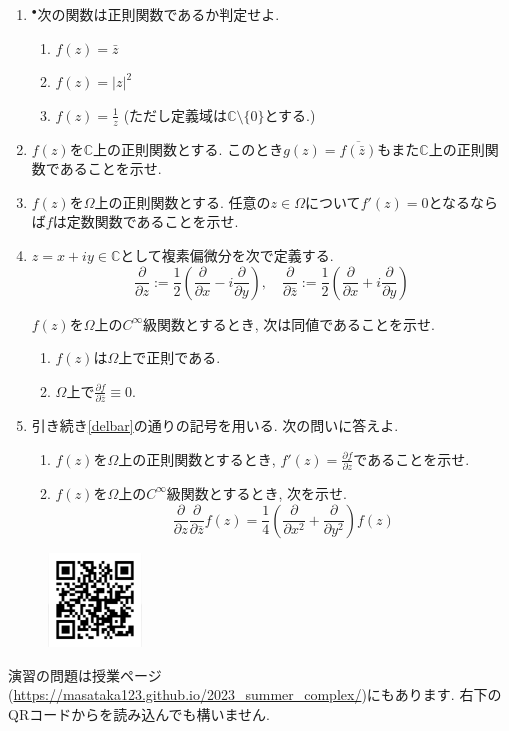 \documentclass[dvipdfmx,a4paper,11pt]{article}
\newcommand{\C}{\mathbb{C}}
\theoremstyle{definition}
\newcommand{\pdrv}[2]{\frac{\partial #1}{\partial #2}}
\begin{document}
\begin{enumerate}[label=\textbf{問}1.\arabic*]
  
 \item $^{\bullet}$次の関数は正則関数であるか判定せよ.
 \begin{enumerate}
\setlength{\parskip}{0cm} 
  \setlength{\itemsep}{0cm} 
  \item $f(z) = \bar{z}$
   \item $f(z) = |z|^2$
    \item $f(z) = \frac{1}{z}$ (ただし定義域は$\C \setminus \{ 0\}$とする.)
 \end{enumerate}
 
 \item $f(z)$を$\C$上の正則関数とする. このとき$g(z) = \overline{f(\bar{z})}$もまた$\C$上の正則関数であることを示せ. 

\item $f(z)$を$\Omega$上の正則関数とする. 任意の$z \in \Omega$について$f'(z)=0$となるならば$f$は定数関数であることを示せ.



\item \label{delbar}$z = x + iy \in \C$として複素偏微分を次で定義する.
$$
\pdrv{}{z} := \frac{1}{2} \left(\pdrv{}{x}  - i \pdrv{}{y} \right), \quad
\pdrv{}{\bar{z}} := \frac{1}{2} \left(\pdrv{}{x}  + i \pdrv{}{y}\right)
$$

$f(z)$を$\Omega $上の$C^{\infty}$級関数とするとき, 次は同値であることを示せ.
\begin{enumerate}
    \setlength{\parskip}{0cm} 
  \setlength{\itemsep}{0cm} 
  \item $f(z)$は$\Omega$上で正則である.
  \item $\Omega$上で$\pdrv{f}{\bar{z}}  \equiv 0$.
\end{enumerate}

\item 引き続き\ref{delbar}の通りの記号を用いる. 次の問いに答えよ. 
 \begin{enumerate}
\setlength{\parskip}{0cm} 
  \setlength{\itemsep}{0cm} 
\item  $f(z)$を$\Omega$上の正則関数とするとき, $f'(z)=\pdrv{f}{z}$であることを示せ.
\item $f(z)$を$\Omega$上の$C^{\infty}$級関数とするとき, 次を示せ.
$$\pdrv{}{z}\pdrv{}{\bar{z}} f(z) = \frac{1}{4}\left(\pdrv{}{x^2} + \pdrv{}{y^2} \right) f(z)$$
 \end{enumerate}
 

 \end{enumerate}

 
 \vspace{11pt}\begin{figure}  \centering\includegraphics[height=25mm, width=25mm]{complex.png}\end{figure}

演習の問題は授業ページ(\url{https://masataka123.github.io/2023_summer_complex/})にもあります. 右下のQRコードからを読み込んでも構いません.


  
  
 
\end{document}
